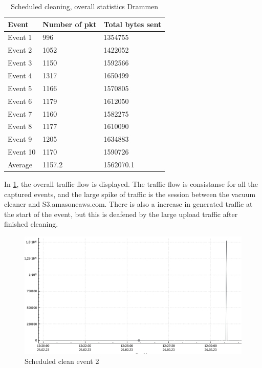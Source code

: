 \begin{table}[H]
\centering
\caption{Scheduled cleaning, overall statistics Drammen}
\label{tab:scoverallDRA}
\begin{tabular}{|l|l|l|}
\hline
\textbf{Event} & \textbf{Number of pkt} & \textbf{Total bytes sent} \\ \hline
Event 1        & 996                    & 1354755                   \\ \hline
Event 2        & 1052                   & 1422052                   \\ \hline
Event 3        & 1150                   & 1592566                   \\ \hline
Event 4        & 1317                   & 1650499                   \\ \hline
Event 5        & 1166                   & 1570805                   \\ \hline
Event 6        & 1179                   & 1612050                   \\ \hline
Event 7        & 1160                   & 1582275                   \\ \hline
Event 8        & 1177                   & 1610090                   \\ \hline
Event 9        & 1205                   & 1634883                   \\ \hline
Event 10       & 1170                   & 1590726                   \\ \hline
Average        & 1157.2                 & 1562070.1                 \\ \hline
\end{tabular}
\end{table}

In \ref{fig:Sc-graph}, the overall traffic flow is displayed. The traffic flow is consistanse for all the captured events, and the large spike of traffic is the session between the vacuum cleaner and S3.amasoneaws.com. There is also a increase in generated traffic at the start of the event, but this is 
deafened by the large upload traffic after finished cleaning.
\begin{figure}[H]
    \centering
    \includegraphics[width=\textwidth]{figures/SC-graph.png}
    \caption{Scheduled clean event 2}
    \label{fig:Sc-graph}
\end{figure}

